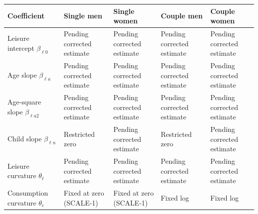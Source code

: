 \documentclass[11pt,a4paper]{article}
\begin{document}
{ %
\small\setlength{\tabcolsep}{3pt}\begin{longtable}[]{@{}
  >{\raggedright\arraybackslash}p{}
  >{\raggedright\arraybackslash}p{}
  >{\raggedright\arraybackslash}p{}
  >{\raggedright\arraybackslash}p{}
  >{\raggedright\arraybackslash}p{}@{}}
\toprule\noalign{}
\begin{minipage}[b]{\linewidth}\raggedright
Coefficient
\end{minipage} & \begin{minipage}[b]{\linewidth}\raggedright
Single men
\end{minipage} & \begin{minipage}[b]{\linewidth}\raggedright
Single women
\end{minipage} & \begin{minipage}[b]{\linewidth}\raggedright
Couple men
\end{minipage} & \begin{minipage}[b]{\linewidth}\raggedright
Couple women
\end{minipage} \\
\midrule\noalign{}
\endhead
\bottomrule\noalign{}
\endlastfoot
Leisure intercept \(\beta_{\ell0}\) & Pending corrected estimate & Pending corrected estimate & Pending corrected estimate & Pending corrected estimate \\
Age slope \(\beta_{\ell a}\) & Pending corrected estimate & Pending corrected estimate & Pending corrected estimate & Pending corrected estimate \\
Age-square slope \(\beta_{\ell a2}\) & Pending corrected estimate & Pending corrected estimate & Pending corrected estimate & Pending corrected estimate \\
Child slope \(\beta_{\ell n}\) & Restricted zero & Pending corrected estimate & Restricted zero & Pending corrected estimate \\
Leisure curvature \(\theta_\ell\) & Pending corrected estimate & Pending corrected estimate & Pending corrected estimate & Pending corrected estimate \\
Consumption curvature \(\theta_c\) & Fixed at zero (SCALE-1) & Fixed at zero (SCALE-1) & Fixed log & Fixed log \\
\end{longtable}
}
\end{document}
